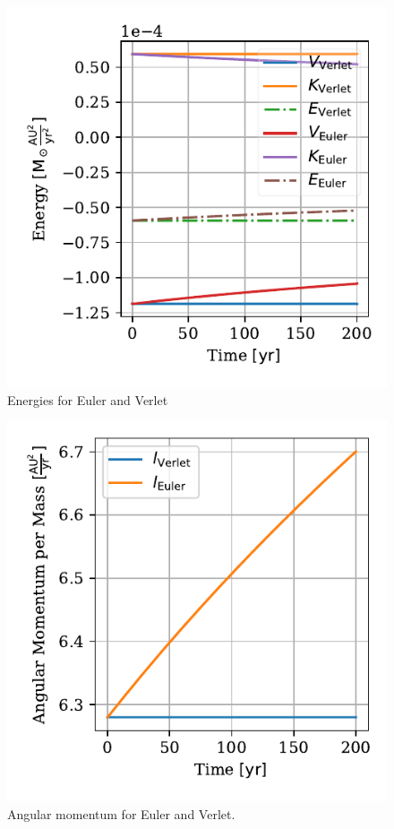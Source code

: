 \documentclass[twocolumn]{aastex62}
\begin{document}
\begin{figure}
\includegraphics[scale=1]{Figures/taskb_energies.pdf}
\caption{Energies for Euler and Verlet}
\label{fig:energy}
\end{figure}

\begin{figure}
\includegraphics[scale=1]{Figures/taskb_angmom.pdf}
\caption{Angular momentum for Euler and Verlet.}
\label{fig:angmom}
\end{figure}
\end{document}
